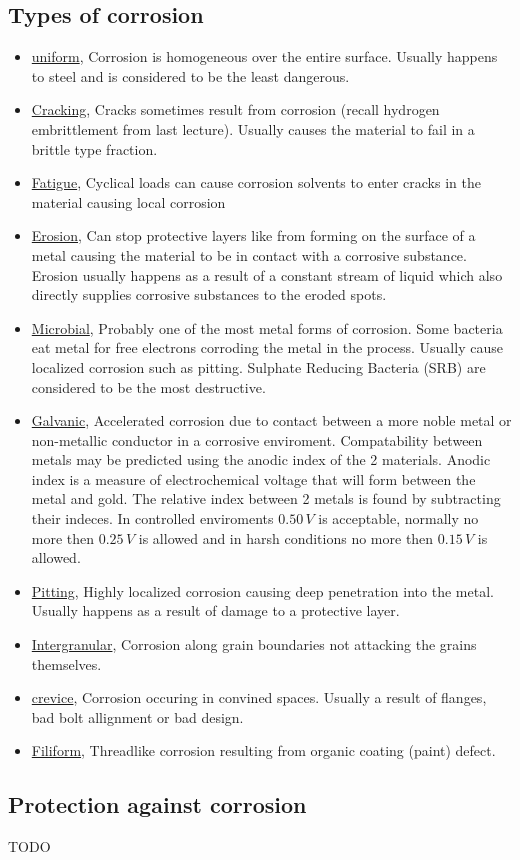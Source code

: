 \documentclass[11pt, a4paper]{article}
\begin{document}
\subsection{Types of corrosion}
\begin{itemize}
  \item \underline{uniform}, Corrosion is homogeneous over the entire surface. Usually happens to steel and is considered to be the least dangerous.
  \item \underline{Cracking}, Cracks sometimes result from corrosion (recall hydrogen embrittlement from last lecture). Usually causes the material to fail in a brittle type fraction.
  \item \underline{Fatigue}, Cyclical loads can cause corrosion solvents to enter cracks in the material causing local corrosion
  \item \underline{Erosion}, Can stop protective layers like  from forming on the surface of a metal causing the material to be in contact with a corrosive substance. Erosion usually happens as a result of a constant stream of liquid which also directly supplies corrosive substances to the eroded spots.
  \item \underline{Microbial}, Probably one of the most metal forms of corrosion. Some bacteria eat metal for free electrons corroding the metal in the process. Usually cause localized corrosion such as pitting. Sulphate Reducing Bacteria (SRB) are considered to be the most destructive.
  \item \underline{Galvanic}, Accelerated corrosion due to contact between a more noble metal or non-metallic conductor in a corrosive enviroment. Compatability between metals may be predicted using the anodic index of the 2 materials. Anodic index is a measure of electrochemical voltage that will form between the metal and gold. The relative index between 2 metals is found by subtracting their indeces. In controlled enviroments $0.50\,V$ is acceptable, normally no more then $0.25\,V$ is allowed and in harsh conditions no more then $0.15\, V$ is allowed.
  \item \underline{Pitting}, Highly localized corrosion causing deep penetration into the metal. Usually happens as a result of damage to a protective layer.
  \item \underline{Intergranular}, Corrosion along grain boundaries not attacking the grains themselves.
  \item \underline{crevice}, Corrosion occuring in convined spaces. Usually a result of flanges, bad bolt allignment or bad design.
  \item \underline{Filiform}, Threadlike corrosion resulting from organic coating (paint) defect.
\end{itemize}


\subsection{Protection against corrosion}
TODO
\end{document}
